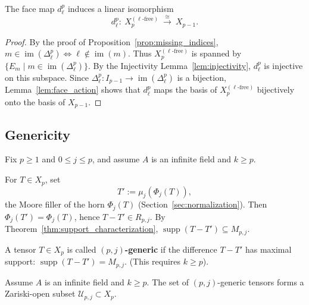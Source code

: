 \begin{corollary}\label{cor:inj-face}
The face map $d_\ell^p$ induces a linear isomorphism
\[
d_\ell^p:\ X_p^{(\ell\text{-free})}\ \xrightarrow{\ \cong\ }\ X_{p-1}.
\]
\end{corollary}



\begin{proof}
By the proof of Proposition~\ref{prop:missing_indices}, $m \in \operatorname{im}(\Delta_\ell^p) \iff \ell \notin \operatorname{im}(m)$. 
Thus $X_p^{(\ell\text{-free})}$ is spanned by $\{E_{m} \mid m \in \operatorname{im}(\Delta_\ell^p)\}$. 
By the Injectivity Lemma~\ref{lem:injectivity}, $d_\ell^p$ is injective on this subspace. 
Since $\Delta_\ell^p: I_{p-1} \to \operatorname{im}(\Delta_\ell^p)$ is a bijection, Lemma~\ref{lem:face_action} 
shows that $d_\ell^p$ maps the basis of $X_p^{(\ell\text{-free})}$ bijectively onto the basis of $X_{p-1}$.
\end{proof}

\subsection{Genericity}

Fix $p\ge 1$ and $0\le j\le p$, and assume $A$ is an infinite field and $k\ge p$.

For $T\in X_p$, set
\[
T' := \mu_j(\Phi_j(T)),
\]
the Moore filler of the horn $\Phi_j(T)$ (Section~\ref{sec:normalization}). Then $\Phi_j(T')=\Phi_j(T)$, hence
$T-T'\in R_{p,j}$. By Theorem~\ref{thm:support_characterization}, $\operatorname{supp}(T-T') \subseteq M_{p,j}$.

\begin{definition}
A tensor $T\in X_p$ is called \textbf{$(p,j)$-generic} if the difference $T-T'$ has maximal support: 
$\operatorname{supp}(T-T')=M_{p,j}$. (This requires $k\ge p$).
\end{definition}


\begin{proposition}\label{prop:generic_locus}
Assume $A$ is an infinite field and $k\ge p$. The set of $(p,j)$-generic tensors forms a Zariski-open subset $\mathcal{U}_{p,j} \subset X_p$.
\end{proposition}


